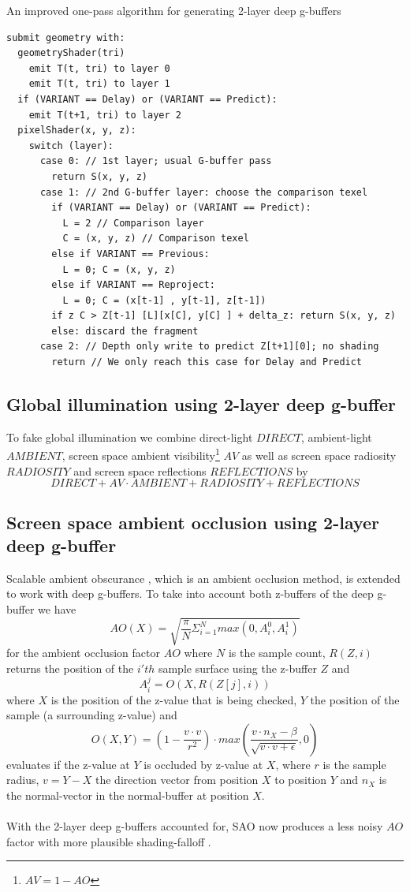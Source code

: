\documentclass{ACGSeminar}
\begin{document}
		\begin{algorithm} \label{alg:one_pass_strawman} \caption{An improved one-pass algorithm for generating 2-layer deep g-buffers}
		\begin{lstlisting}[frame=single]
submit geometry with:
  geometryShader(tri)
    emit T(t, tri) to layer 0
    emit T(t, tri) to layer 1
  if (VARIANT == Delay) or (VARIANT == Predict):
    emit T(t+1, tri) to layer 2
  pixelShader(x, y, z):
    switch (layer):
      case 0: // 1st layer; usual G-buffer pass
        return S(x, y, z)
      case 1: // 2nd G-buffer layer: choose the comparison texel
        if (VARIANT == Delay) or (VARIANT == Predict):
          L = 2 // Comparison layer
          C = (x, y, z) // Comparison texel
        else if VARIANT == Previous:
          L = 0; C = (x, y, z)
        else if VARIANT == Reproject:
          L = 0; C = (x[t-1] , y[t-1], z[t-1])
        if z C > Z[t-1] [L][x[C], y[C] ] + delta_z: return S(x, y, z)
        else: discard the fragment
      case 2: // Depth only write to predict Z[t+1][0]; no shading
        return // We only reach this case for Delay and Predict
		\end{lstlisting}
		\end{algorithm}
	\subsection{Global illumination using 2-layer deep g-buffer} 
		To fake global illumination we combine direct-light $DIRECT$, ambient-light $AMBIENT$, screen space ambient visibility\footnote{$AV = 1-AO$} $AV$ as well as screen space radiosity $RADIOSITY$ and screen space reflections $REFLECTIONS$ by \cite{RSM} \cite{TSTMT}
		$$ DIRECT + AV \cdot AMBIENT + RADIOSITY + REFLECTIONS $$
		
	\subsection{Screen space ambient occlusion using 2-layer deep g-buffer}
		Scalable ambient obscurance \cite{SAO}, which is an ambient occlusion method, is extended to work with deep g-buffers. To take into account both z-buffers of the deep g-buffer we have
		$$ AO(X) = \sqrt{\frac{\pi}{N} \Sigma_{i=1}^{N} max(0, A_{i}^{0}, A_{i}^{1})} $$
		for the ambient occlusion factor $AO$ where $N$ is the sample count, $R(Z, i)$ returns the position of the $i'th$ sample surface using the z-buffer $Z$ and
		$$ A_{i}^{j} = O(X, R(Z[j], i))$$
		where $X$ is the position of the z-value that is being checked, $Y$ the position of the sample (a surrounding z-value) and
		$$ O(X, Y) = (1 - \frac{v \cdot v}{r^2}) \cdot max(\frac{v \cdot n_X - \beta}{\sqrt{v \cdot v + \epsilon}}, 0) $$
		evaluates if the z-value at $Y$ is occluded by z-value at $X$, where $r$ is the sample radius, $v = Y - X$ the direction vector from position $X$ to position $Y$ and $n_X$ is the normal-vector in the normal-buffer at position $X$. \\\\
		With the 2-layer deep g-buffers accounted for, SAO now produces a less noisy $AO$ factor with more plausible shading-falloff \cite{Mara2016DeepGBuffer}. 
		
\end{document}

